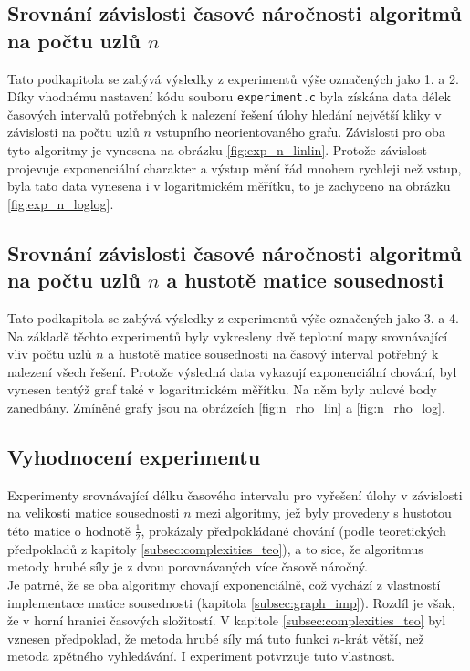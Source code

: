 \documentclass[a4paper]{article}
\begin{document}
    \subsection{Srovnání závislosti časové náročnosti algoritmů na počtu uzlů $n$}
        Tato podkapitola se zabývá výsledky z experimentů výše označených jako 1. a 2. Díky vhodnému nastavení kódu souboru \lstinline{experiment.c} byla získána data délek časových intervalů potřebných k nalezení řešení úlohy hledání největší kliky v závislosti na počtu uzlů $n$ vstupního neorientovaného grafu. Závislosti pro oba tyto algoritmy je vynesena na obrázku \ref{fig:exp_n_linlin}. Protože závislost projevuje exponenciální charakter a výstup mění řád mnohem rychleji než vstup, byla tato data vynesena i v logaritmickém měřítku, to je zachyceno na obrázku \ref{fig:exp_n_loglog}.

    \subsection{Srovnání závislosti časové náročnosti algoritmů na počtu uzlů $n$ a hustotě matice sousednosti}
        Tato podkapitola se zabývá výsledky z experimentů výše označených jako 3. a 4. Na základě těchto experimentů byly vykresleny dvě teplotní mapy srovnávající vliv počtu uzlů $n$ a hustotě matice sousednosti na časový interval potřebný k nalezení všech řešení. Protože výsledná data vykazují exponenciální chování, byl vynesen tentýž graf také v logaritmickém měřítku. Na něm byly nulové body zanedbány. Zmíněné grafy jsou na obrázcích \ref{fig:n_rho_lin} a \ref{fig:n_rho_log}.

    \subsection{Vyhodnocení experimentu}
        Experimenty srovnávající délku časového intervalu pro vyřešení úlohy v závislosti na velikosti matice sousednosti $n$ mezi algoritmy, jež byly provedeny s hustotou této matice o hodnotě $\frac{1}{2}$, prokázaly předpokládané chování (podle teoretických předpokladů z kapitoly \ref{subsec:complexities_teo}), a to sice, že algoritmus metody hrubé síly je z dvou porovnávaných více časově náročný.\\
        
        \noindent
        Je patrné, že se oba algoritmy chovají exponenciálně, což vychází z vlastností implementace matice sousednosti (kapitola \ref{subsec:graph_imp}). Rozdíl je však, že v horní hranici časových složitostí. V kapitole \ref{subsec:complexities_teo} byl vznesen předpoklad, že metoda hrubé síly má tuto funkci $n$-krát větší, než metoda zpětného vyhledávání. I experiment potvrzuje tuto vlastnost.\\
\end{document}
